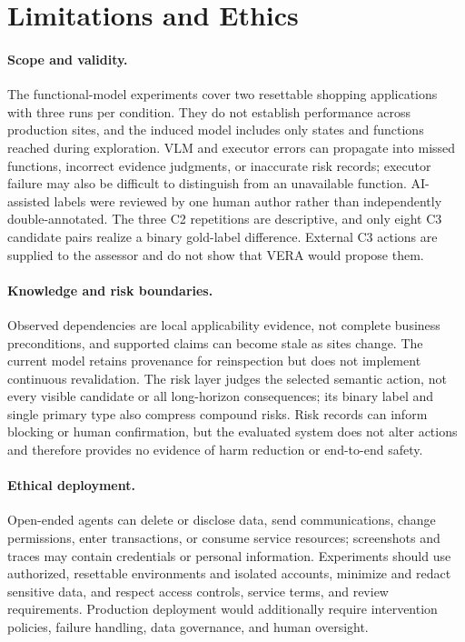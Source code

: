\section{Limitations and Ethics}
\label{sec:limitations}

\paragraph{Scope and validity.}
The functional-model experiments cover two resettable shopping applications
with three runs per condition. They do not establish performance across
production sites, and the induced model includes only states and functions
reached during exploration. VLM and executor errors can propagate into missed
functions, incorrect evidence judgments, or inaccurate risk records; executor
failure may also be difficult to distinguish from an unavailable function.
AI-assisted labels were reviewed by one human author rather than independently
double-annotated. The three C2 repetitions are descriptive, and only eight C3
candidate pairs realize a binary gold-label difference. External C3 actions are
supplied to the assessor and do not show that VERA would propose them.

\paragraph{Knowledge and risk boundaries.}
Observed dependencies are local applicability evidence, not complete business
preconditions, and supported claims can become stale as sites change. The
current model retains provenance for reinspection but does not implement
continuous revalidation. The risk layer judges the selected semantic action,
not every visible candidate or all long-horizon consequences; its binary label
and single primary type also compress compound risks. Risk records can inform
blocking or human confirmation, but the evaluated system does not alter actions
and therefore provides no evidence of harm reduction or end-to-end safety.

\paragraph{Ethical deployment.}
Open-ended agents can delete or disclose data, send communications, change
permissions, enter transactions, or consume service resources; screenshots and
traces may contain credentials or personal information. Experiments should use
authorized, resettable environments and isolated accounts, minimize and redact
sensitive data, and respect access controls, service terms, and review
requirements. Production deployment would additionally require intervention
policies, failure handling, data governance, and human oversight.

